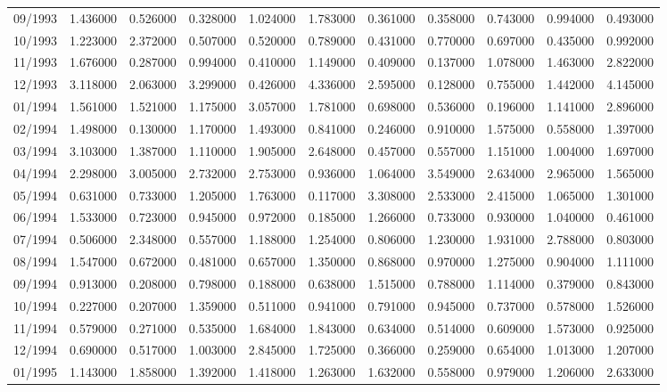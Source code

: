 \begin{tabular}{lrrrrrrrrrr}
09/1993 & 1.436000 & 0.526000 & 0.328000 & 1.024000 & 1.783000 & 0.361000 & 0.358000 & 0.743000 & 0.994000 & 0.493000 \\
10/1993 & 1.223000 & 2.372000 & 0.507000 & 0.520000 & 0.789000 & 0.431000 & 0.770000 & 0.697000 & 0.435000 & 0.992000 \\
11/1993 & 1.676000 & 0.287000 & 0.994000 & 0.410000 & 1.149000 & 0.409000 & 0.137000 & 1.078000 & 1.463000 & 2.822000 \\
12/1993 & 3.118000 & 2.063000 & 3.299000 & 0.426000 & 4.336000 & 2.595000 & 0.128000 & 0.755000 & 1.442000 & 4.145000 \\
01/1994 & 1.561000 & 1.521000 & 1.175000 & 3.057000 & 1.781000 & 0.698000 & 0.536000 & 0.196000 & 1.141000 & 2.896000 \\
02/1994 & 1.498000 & 0.130000 & 1.170000 & 1.493000 & 0.841000 & 0.246000 & 0.910000 & 1.575000 & 0.558000 & 1.397000 \\
03/1994 & 3.103000 & 1.387000 & 1.110000 & 1.905000 & 2.648000 & 0.457000 & 0.557000 & 1.151000 & 1.004000 & 1.697000 \\
04/1994 & 2.298000 & 3.005000 & 2.732000 & 2.753000 & 0.936000 & 1.064000 & 3.549000 & 2.634000 & 2.965000 & 1.565000 \\
05/1994 & 0.631000 & 0.733000 & 1.205000 & 1.763000 & 0.117000 & 3.308000 & 2.533000 & 2.415000 & 1.065000 & 1.301000 \\
06/1994 & 1.533000 & 0.723000 & 0.945000 & 0.972000 & 0.185000 & 1.266000 & 0.733000 & 0.930000 & 1.040000 & 0.461000 \\
07/1994 & 0.506000 & 2.348000 & 0.557000 & 1.188000 & 1.254000 & 0.806000 & 1.230000 & 1.931000 & 2.788000 & 0.803000 \\
08/1994 & 1.547000 & 0.672000 & 0.481000 & 0.657000 & 1.350000 & 0.868000 & 0.970000 & 1.275000 & 0.904000 & 1.111000 \\
09/1994 & 0.913000 & 0.208000 & 0.798000 & 0.188000 & 0.638000 & 1.515000 & 0.788000 & 1.114000 & 0.379000 & 0.843000 \\
10/1994 & 0.227000 & 0.207000 & 1.359000 & 0.511000 & 0.941000 & 0.791000 & 0.945000 & 0.737000 & 0.578000 & 1.526000 \\
11/1994 & 0.579000 & 0.271000 & 0.535000 & 1.684000 & 1.843000 & 0.634000 & 0.514000 & 0.609000 & 1.573000 & 0.925000 \\
12/1994 & 0.690000 & 0.517000 & 1.003000 & 2.845000 & 1.725000 & 0.366000 & 0.259000 & 0.654000 & 1.013000 & 1.207000 \\
01/1995 & 1.143000 & 1.858000 & 1.392000 & 1.418000 & 1.263000 & 1.632000 & 0.558000 & 0.979000 & 1.206000 & 2.633000 \\

\end{tabular}
